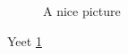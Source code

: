 \documentclass{article}
\newcommand{\includeGraph}[3]{
 	\begin{figure}[h!]
 		\begin{center}
 			\fbox{
 				\texttt{[image: \#2]}
 			}
 			\caption{#3} \label{#1}
 		\end{center}
 	\end{figure}
 }
\begin{document}
\includeGraph{apic}{./test.eps}{A nice picture}
Yeet \ref{apic}

 
\end{document}
